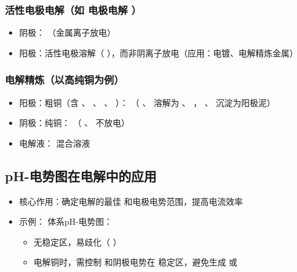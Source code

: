 \subsubsection{活性电极电解（如  电极电解  ）} 
\begin{itemize} 
    \item 阴极：  （金属离子放电）
    \item 阳极：活性电极溶解（  ），而非阴离子放电（应用：电镀、电解精炼金属）
\end{itemize} 

\subsubsection{电解精炼（以高纯铜为例）} 
\begin{itemize} 
    \item 阳极：粗铜（含  、  、  、  ）：  （  、  溶解为  、  ，  、  沉淀为阳极泥）
    \item 阴极：纯铜：  （  、  不放电）
    \item 电解液：  混合溶液
\end{itemize} 

\subsection{pH-电势图在电解中的应用} 
\begin{itemize} 
    \item 核心作用：确定电解的最佳  和电极电势范围，提高电流效率
    \item 示例：  体系pH-电势图：
    \begin{itemize} 
        \item  {} 无稳定区，易歧化（  ）
        \item 电解铜时，需控制  和阴极电势在  稳定区，避免生成  或  
    \end{itemize} 
\end{itemize} 

